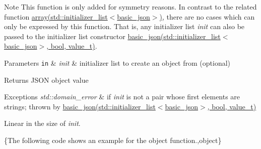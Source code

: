 \begin{DoxyNote}{Note}
This function is only added for symmetry reasons. In contrast to the related function \hyperlink{classnlohmann_1_1basic__json_a5685815624b086caa532f41e853d4b0f}{array(std\-::initializer\-\_\-list$<$basic\-\_\-json$>$)}, there are no cases which can only be expressed by this function. That is, any initializer list {\itshape init} can also be passed to the initializer list constructor \hyperlink{classnlohmann_1_1basic__json_afeb998aec45296bc2050bd1c41ef41eb}{basic\-\_\-json(std\-::initializer\-\_\-list$<$basic\-\_\-json$>$, bool, value\-\_\-t)}.
\end{DoxyNote}

\begin{DoxyParams}[1]{Parameters}
\mbox{\tt in}  & {\em init} & initializer list to create an object from (optional)\\
\hline
\end{DoxyParams}
\begin{DoxyReturn}{Returns}
J\-S\-O\-N object value
\end{DoxyReturn}

\begin{DoxyExceptions}{Exceptions}
{\em std\-::domain\-\_\-error} & if {\itshape init} is not a pair whose first elements are strings; thrown by \hyperlink{classnlohmann_1_1basic__json_afeb998aec45296bc2050bd1c41ef41eb}{basic\-\_\-json(std\-::initializer\-\_\-list$<$basic\-\_\-json$>$, bool, value\-\_\-t)}\\
\hline
\end{DoxyExceptions}
Linear in the size of {\itshape init}.

\{The following code shows an example for the {\ttfamily object} function.,object\}

